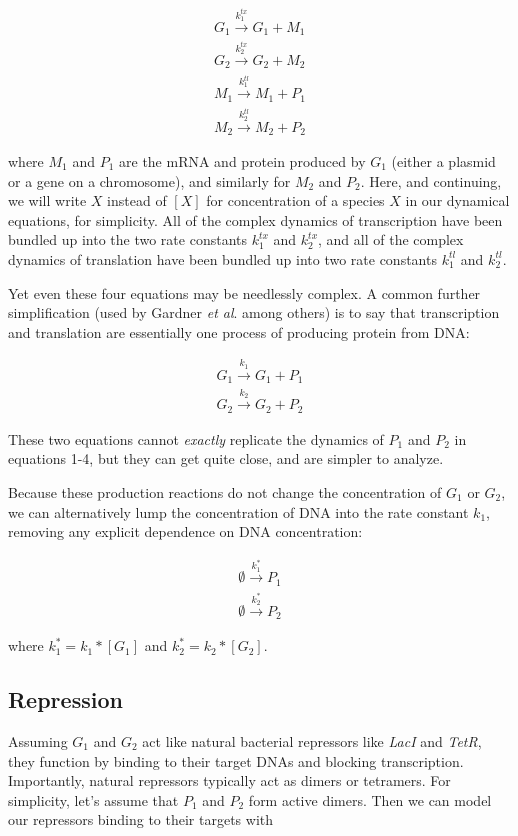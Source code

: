\documentclass[preprint,12pt]{elsarticle}
\begin{document}
\begin{align}
	G_1 \xrightarrow{k_1^{tx}} G_1 + M_1\\
	G_2 \xrightarrow{k_2^{tx}} G_2 + M_2\\
	M_1 \xrightarrow{k_1^{tl}} M_1 + P_1\\
	M_2 \xrightarrow{k_2^{tl}} M_2 + P_2
\end{align}

where $M_1$ and $P_1$ are the mRNA and protein produced by $G_1$ (either a plasmid or a gene on a chromosome), and similarly for $M_2$ and $P_2$. Here, and continuing, we will write $X$ instead of $[X]$ for concentration of a species $X$ in our dynamical equations, for simplicity. All of the complex dynamics of transcription have been bundled up into the two rate constants $k_1^{tx}$ and $k_2^{tx}$, and all of the complex dynamics of translation have been bundled up into two rate constants $k_1^{tl}$ and $k_2^{tl}$. 

Yet even these four equations may be needlessly complex. A common further simplification (used by Gardner \emph{et al}. among others) is to say that transcription and translation are essentially one process of producing protein from DNA:

\begin{align}
	G_1 \xrightarrow{k_1} G_1 + P_1\\
	G_2 \xrightarrow{k_2} G_2 + P_2
\end{align}

These two equations cannot \emph{exactly} replicate the dynamics of $P_1$ and $P_2$ in equations 1-4, but they can get quite close, and are simpler to analyze. 

Because these production reactions do not change the concentration of $G_1$ or $G_2$, we can alternatively lump the concentration of DNA into the rate constant $k_1$, removing any explicit dependence on DNA concentration:

\begin{align}
	\emptyset \xrightarrow{k_1^*} P_1\\
	\emptyset \xrightarrow{k_2^*} P_2
\end{align}

where $k_1^* = k_1*[G_1]$ and $k_2^* = k_2*[G_2]$.

\subsection{Repression}\label{ss:repression}

Assuming $G_1$ and $G_2$ act like natural bacterial repressors like \emph{LacI} and \emph{TetR}, they function by binding to their target DNAs and blocking transcription. Importantly, natural repressors typically act as dimers or tetramers. For simplicity, let's assume that $P_1$ and $P_2$ form active dimers. Then we can model our repressors binding to their targets with 
\end{document}
